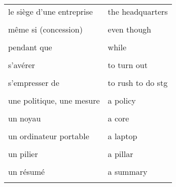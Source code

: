 \documentclass[
  10pt,
]{article}
\begin{document}
\begin{longtable}{ll}
le siège d'une entreprise & the headquarters\\

\cellcolor{gray!6}{mais, pourtant} & \cellcolor{gray!6}{yet}\\

même si (concession) & even though\\

\cellcolor{gray!6}{mettre en oeuvre} & \cellcolor{gray!6}{to implement}\\

pendant que & while\\

\cellcolor{gray!6}{réclamer, exiger} & \cellcolor{gray!6}{to call for}\\

s'avérer & to turn out\\

\cellcolor{gray!6}{se concentrer sur qqch} & \cellcolor{gray!6}{to focus on stg}\\

s'empresser de & to rush to do stg\\

\cellcolor{gray!6}{stable} & \cellcolor{gray!6}{steady}\\

une politique, une mesure & a policy\\

\cellcolor{gray!6}{un intrus} & \cellcolor{gray!6}{an odd-one-out}\\

un noyau & a core\\

\cellcolor{gray!6}{un ordinateur de bureau} & \cellcolor{gray!6}{a desktop}\\

un ordinateur portable & a laptop\\

\cellcolor{gray!6}{un outil} & \cellcolor{gray!6}{a tool}\\

un pilier & a pillar\\

\cellcolor{gray!6}{un portail} & \cellcolor{gray!6}{a gate}\\

un résumé & a summary\\

\cellcolor{gray!6}{un sondage} & \cellcolor{gray!6}{a poll}\\
\bottomrule
\end{longtable}
\end{document}

